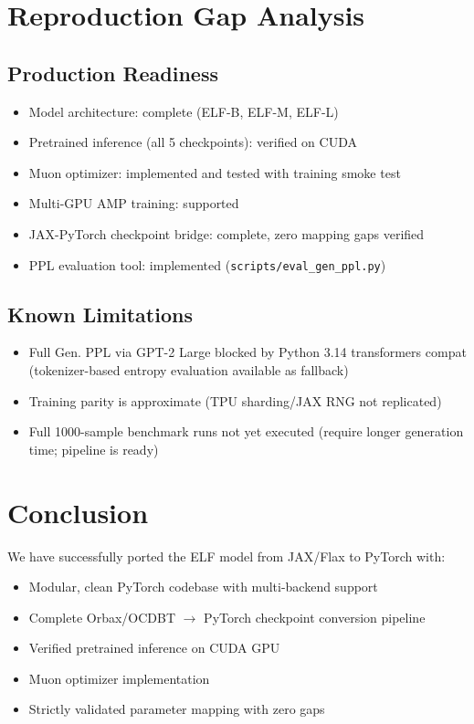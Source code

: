 \documentclass[11pt]{article}
\begin{document}
\section{Reproduction Gap Analysis}

\subsection{Production Readiness}
\begin{itemize}
\item[$\checkmark$] Model architecture: complete (ELF-B, ELF-M, ELF-L)
\item[$\checkmark$] Pretrained inference (all 5 checkpoints): verified on CUDA
\item[$\checkmark$] Muon optimizer: implemented and tested with training smoke test
\item[$\checkmark$] Multi-GPU AMP training: supported
\item[$\checkmark$] JAX-PyTorch checkpoint bridge: complete, zero mapping gaps verified
\item[$\checkmark$] PPL evaluation tool: implemented (\texttt{scripts/eval\_gen\_ppl.py})
\end{itemize}

\subsection{Known Limitations}
\begin{itemize}
\item[$\sim$] Full Gen. PPL via GPT-2 Large blocked by Python 3.14 transformers compat
           (tokenizer-based entropy evaluation available as fallback)
\item[$\sim$] Training parity is approximate (TPU sharding/JAX RNG not replicated)
\item[$\sim$] Full 1000-sample benchmark runs not yet executed
           (require longer generation time; pipeline is ready)
\end{itemize}

\section{Conclusion}

We have successfully ported the ELF model from JAX/Flax to PyTorch with:
\begin{itemize}
\item Modular, clean PyTorch codebase with multi-backend support
\item Complete Orbax/OCDBT $\to$ PyTorch checkpoint conversion pipeline
\item Verified pretrained inference on CUDA GPU
\item Muon optimizer implementation
\item Strictly validated parameter mapping with zero gaps
\end{itemize}
\end{document}
